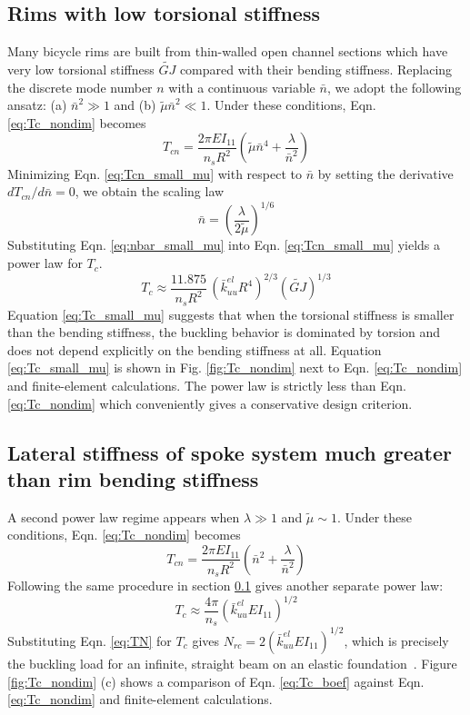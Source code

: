 \documentclass{bmd2016p}
\begin{document}
\subsection{Rims with low torsional stiffness}\label{sec:powerlaw_1}
Many bicycle rims are built from thin-walled open channel sections which have very low torsional stiffness $\widetilde{GJ}$ compared with their bending stiffness. Replacing the discrete mode number $n$ with a continuous variable $\bar{n}$, we adopt the following ansatz: (a) $\bar{n}^2 \gg 1$ and (b) $\tilde{\mu}\bar{n}^2 \ll 1$. Under these conditions, Eqn. \ref{eq:Tc_nondim} becomes
	\begin{equation}\label{eq:Tcn_small_mu}
	T_{cn} = \frac{2\pi EI_{11}}{n_sR^2} \left( \tilde{\mu}\bar{n}^4 + \frac{\lambda}{\bar{n}^2}\right)
	\end{equation}
Minimizing Eqn. \ref{eq:Tcn_small_mu} with respect to $\bar{n}$ by setting the derivative $dT_{cn}/d\bar{n}=0$, we obtain the scaling law
	\begin{equation}\label{eq:nbar_small_mu}
	\bar{n} = \left(\frac{\lambda}{2\tilde{\mu}} \right)^{1/6}
	\end{equation}
Substituting Eqn. \ref{eq:nbar_small_mu} into Eqn. \ref{eq:Tcn_small_mu} yields a power law for $T_c$.
	\begin{equation}\label{eq:Tc_small_mu}
	T_c \approx \frac{11.875}{n_sR^2} \, \left(\bar{k}_{uu}^{el}R^4 \right)^{2/3} (\widetilde{GJ})^{1/3}
	\end{equation}
Equation \ref{eq:Tc_small_mu} suggests that when the torsional stiffness is smaller than the bending stiffness, the buckling behavior is dominated by torsion and does not depend explicitly on the bending stiffness at all. Equation \ref{eq:Tc_small_mu} is shown in Fig. \ref{fig:Tc_nondim} next to Eqn. \ref{eq:Tc_nondim} and finite-element calculations. The power law is strictly less than Eqn. \ref{eq:Tc_nondim} which conveniently gives a conservative design criterion.


\subsection{Lateral stiffness of spoke system much greater than rim bending stiffness}
A second power law regime appears when $\lambda \gg 1$ and $\tilde{\mu} \sim 1$. Under these conditions, Eqn. \ref{eq:Tc_nondim} becomes
	\begin{equation}\label{eq:Tcn_boef}
	T_{cn} = \frac{2\pi EI_{11}}{n_sR^2}\left(\bar{n}^2 + \frac{\lambda}{\bar{n}^2} \right)
	\end{equation}
Following the same procedure in section \ref{sec:powerlaw_1} gives another separate power law:
	\begin{equation}\label{eq:Tc_boef}
	T_c \approx \frac{4\pi}{n_s} \left(\bar{k}_{uu}^{el}EI_{11} \right)^{1/2} 
	\end{equation}
Substituting Eqn. \ref{eq:TN} for $T_c$ gives $N_{rc}=2\left(\bar{k}_{uu}^{el}EI_{11}\right)^{1/2}$, which is precisely the buckling load for an infinite, straight beam on an elastic foundation~\cite{Hetenyi1946b}. Figure \ref{fig:Tc_nondim} (c) shows a comparison of Eqn. \ref{eq:Tc_boef} against Eqn. \ref{eq:Tc_nondim} and finite-element calculations.
\end{document}
